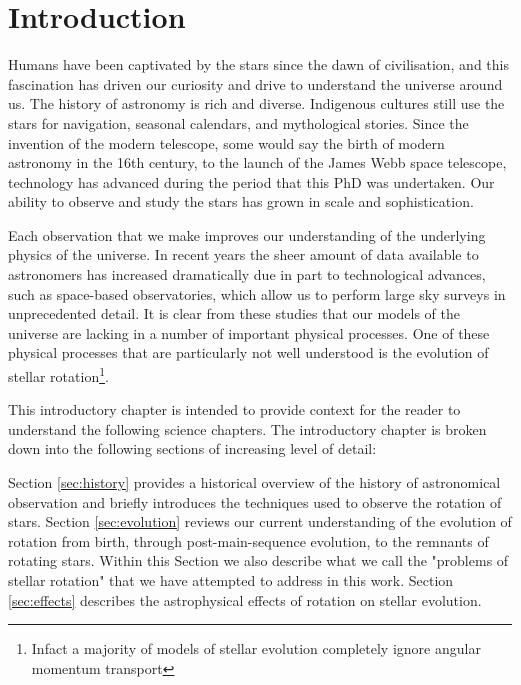 

\newcommand\dive{\textmd{div}}
\newcommand\der{\textmd{d}}




\chapter{Introduction}

Humans have been captivated by the stars since the dawn of civilisation, and this fascination has driven our curiosity and drive to understand the universe around us. 
The history of astronomy is rich and diverse. 
Indigenous cultures still use the stars for navigation, seasonal calendars, and mythological stories. 
Since the invention of the modern telescope, some would say the birth of modern astronomy in the 16th century, to the launch of the James Webb space telescope, technology has advanced during the period that this PhD was undertaken. 
Our ability to observe and study the stars has grown in scale and sophistication. 

Each observation that we make improves our understanding of the underlying physics of the universe. 
In recent years the sheer amount of data available to astronomers has increased dramatically due in part to technological advances, such as space-based observatories, which allow us to perform large sky surveys in unprecedented detail. 
It is clear from these studies that our models of the universe are lacking in a number of important physical processes. 
One of these physical processes that are particularly not well understood is the evolution of stellar rotation\footnote{Infact a majority of models of stellar evolution completely ignore angular momentum transport}.

This introductory chapter is intended to provide context for the reader to understand the following science chapters. 
The introductory chapter is broken down into the following sections of increasing level of detail:

Section \ref{sec:history} provides a historical overview of the history of astronomical observation and briefly introduces the techniques used to observe the rotation of stars.
Section \ref{sec:evolution} reviews our current understanding of the evolution of rotation from birth, through post-main-sequence evolution, to the remnants of rotating stars. Within this Section we also describe what we call the "problems of stellar rotation" that we have attempted to address in this work.
Section \ref{sec:effects} describes the astrophysical effects of rotation on stellar evolution.

